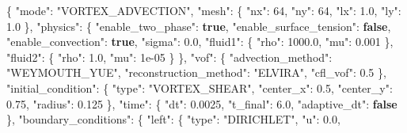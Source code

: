 \documentclass[
  10pt,
]{article}
\newenvironment{Shaded}{}{}
\newcommand{\DataTypeTok}[1]{\textcolor[rgb]{0.56,0.13,0.00}{#1}}
\newcommand{\DecValTok}[1]{\textcolor[rgb]{0.25,0.63,0.44}{#1}}
\newcommand{\FloatTok}[1]{\textcolor[rgb]{0.25,0.63,0.44}{#1}}
\newcommand{\FunctionTok}[1]{\textcolor[rgb]{0.02,0.16,0.49}{#1}}
\newcommand{\KeywordTok}[1]{\textcolor[rgb]{0.00,0.44,0.13}{\textbf{#1}}}
\newcommand{\StringTok}[1]{\textcolor[rgb]{0.25,0.44,0.63}{#1}}
\begin{document}
\begin{Shaded}
\begin{Highlighting}[]
\FunctionTok{\{}
  \DataTypeTok{"mode"}\FunctionTok{:} \StringTok{"VORTEX\_ADVECTION"}\FunctionTok{,}
  \DataTypeTok{"mesh"}\FunctionTok{:} \FunctionTok{\{}
    \DataTypeTok{"nx"}\FunctionTok{:} \DecValTok{64}\FunctionTok{,}
    \DataTypeTok{"ny"}\FunctionTok{:} \DecValTok{64}\FunctionTok{,}
    \DataTypeTok{"lx"}\FunctionTok{:} \FloatTok{1.0}\FunctionTok{,}
    \DataTypeTok{"ly"}\FunctionTok{:} \FloatTok{1.0}
  \FunctionTok{\},}
  \DataTypeTok{"physics"}\FunctionTok{:} \FunctionTok{\{}
    \DataTypeTok{"enable\_two\_phase"}\FunctionTok{:} \KeywordTok{true}\FunctionTok{,}
    \DataTypeTok{"enable\_surface\_tension"}\FunctionTok{:} \KeywordTok{false}\FunctionTok{,}
    \DataTypeTok{"enable\_convection"}\FunctionTok{:} \KeywordTok{true}\FunctionTok{,}
    \DataTypeTok{"sigma"}\FunctionTok{:} \FloatTok{0.0}\FunctionTok{,}
    \DataTypeTok{"fluid1"}\FunctionTok{:} \FunctionTok{\{}
      \DataTypeTok{"rho"}\FunctionTok{:} \FloatTok{1000.0}\FunctionTok{,}
      \DataTypeTok{"mu"}\FunctionTok{:} \FloatTok{0.001}
    \FunctionTok{\},}
    \DataTypeTok{"fluid2"}\FunctionTok{:} \FunctionTok{\{}
      \DataTypeTok{"rho"}\FunctionTok{:} \FloatTok{1.0}\FunctionTok{,}
      \DataTypeTok{"mu"}\FunctionTok{:} \DecValTok{1e{-}05}
    \FunctionTok{\}}
  \FunctionTok{\},}
  \DataTypeTok{"vof"}\FunctionTok{:} \FunctionTok{\{}
    \DataTypeTok{"advection\_method"}\FunctionTok{:} \StringTok{"WEYMOUTH\_YUE"}\FunctionTok{,}
    \DataTypeTok{"reconstruction\_method"}\FunctionTok{:} \StringTok{"ELVIRA"}\FunctionTok{,}
    \DataTypeTok{"cfl\_vof"}\FunctionTok{:} \FloatTok{0.5}
  \FunctionTok{\},}
  \DataTypeTok{"initial\_condition"}\FunctionTok{:} \FunctionTok{\{}
    \DataTypeTok{"type"}\FunctionTok{:} \StringTok{"VORTEX\_SHEAR"}\FunctionTok{,}
    \DataTypeTok{"center\_x"}\FunctionTok{:} \FloatTok{0.5}\FunctionTok{,}
    \DataTypeTok{"center\_y"}\FunctionTok{:} \FloatTok{0.75}\FunctionTok{,}
    \DataTypeTok{"radius"}\FunctionTok{:} \FloatTok{0.125}
  \FunctionTok{\},}
  \DataTypeTok{"time"}\FunctionTok{:} \FunctionTok{\{}
    \DataTypeTok{"dt"}\FunctionTok{:} \FloatTok{0.0025}\FunctionTok{,}
    \DataTypeTok{"t\_final"}\FunctionTok{:} \FloatTok{6.0}\FunctionTok{,}
    \DataTypeTok{"adaptive\_dt"}\FunctionTok{:} \KeywordTok{false}
  \FunctionTok{\},}
  \DataTypeTok{"boundary\_conditions"}\FunctionTok{:} \FunctionTok{\{}
    \DataTypeTok{"left"}\FunctionTok{:} \FunctionTok{\{}
      \DataTypeTok{"type"}\FunctionTok{:} \StringTok{"DIRICHLET"}\FunctionTok{,}
      \DataTypeTok{"u"}\FunctionTok{:} \FloatTok{0.0}\FunctionTok{,}

\end{Highlighting}
\end{Shaded}
\end{document}
